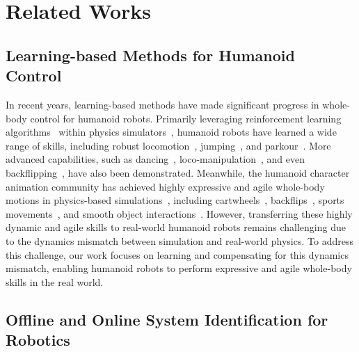 \section{Related Works}
\label{sec:relatedwork}

\subsection{Learning-based Methods for Humanoid Control}

In recent years, learning-based methods have made significant progress in whole-body control for humanoid robots. Primarily leveraging reinforcement learning algorithms~\cite{schulman2017proximal} within physics simulators~\cite{makoviychuk2021isaac, mittal2023orbit, todorov2012mujoco}, humanoid robots have learned a wide range of skills, including robust locomotion~\cite{li2019using, xie2020learning, li2021reinforcement, liao2024berkeley, li2024reinforcement, radosavovic2024real, radosavovic2402humanoid, gu2024advancing, zhang2024whole}, jumping~\cite{li2023robust}, and parkour~\cite{long2024learning, zhuang2024humanoid}. More advanced capabilities, such as dancing~\cite{zhang2024wococo, ji2024exbody2, cheng2024expressive}, loco-manipulation~\cite{he2024learning, lu2024mobile, fu2024humanplus, he2024omnih2o}, and even backflipping~\cite{Unitree2024H1Backflip}, have also been demonstrated. Meanwhile, the humanoid character animation community has achieved highly expressive and agile whole-body motions in physics-based simulations~\cite{peng2022ase, tessler2024maskedmimic, luo2023perpetual}, including cartwheels~\cite{peng2018deepmimic}, backflips~\cite{peng2018sfv}, sports movements~\cite{yuan2023learning, wang2024strategy, luo2024smplolympics, wang2023physhoi, wang2024skillmimic}, and smooth object interactions~\cite{tessler2024maskedmimic, gao2024coohoi, hassan2023synthesizing}. However, transferring these highly dynamic and agile skills to real-world humanoid robots remains challenging due to the dynamics mismatch between simulation and real-world physics. 
To address this challenge, our work focuses on learning and compensating for this dynamics mismatch, enabling humanoid robots to perform expressive and agile whole-body skills in the real world. 

\subsection{Offline and Online System Identification for Robotics}


